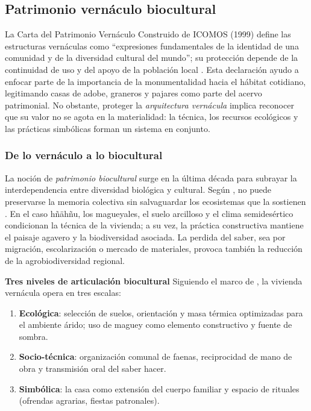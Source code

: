 \subsection{Patrimonio vernáculo biocultural}
\label{subsec:vernaculo_biocultural}

La Carta del Patrimonio Vernáculo Construido de ICOMOS (1999) define las
estructuras vernáculas como ``expresiones fundamentales de la identidad
de una comunidad y de la diversidad cultural del mundo''; su protección
depende de la continuidad de uso y del apoyo de la población local
\citep{icomos1999carta}.  Esta declaración ayudo a enfocar parte de la importancia de la
monumentalidad hacia el hábitat cotidiano, legitimando casas de adobe,
graneros y pajares como parte del acervo patrimonial.  No obstante,
proteger la \emph{arquitectura vernácula} implica reconocer que su valor
no se agota en la materialidad: la técnica, los recursos ecológicos y
las prácticas simbólicas forman un sistema en conjunto.

\subsubsection{De lo vernáculo a lo biocultural}

La noción de \emph{patrimonio biocultural} surge en la última década
para subrayar la interdependencia entre diversidad biológica y cultural.
Según \citeauthor{chang2010patrimonio}, no puede preservarse la memoria
colectiva sin salvaguardar los ecosistemas que la sostienen
\citep{chang2010patrimonio}.  En el caso hñähñu, los
magueyales, el suelo arcilloso y el clima semidesértico condicionan la
técnica de la vivienda; a su vez, la práctica constructiva mantiene el
paisaje agavero y la biodiversidad asociada.  La perdida del saber,
sea por migración, escolarización o mercado de materiales, provoca
también la reducción de la agrobiodiversidad regional.

\medskip
\noindent\textbf{Tres niveles de articulación biocultural}
Siguiendo el marco de \cite{gudynas2010desarrollo}, la vivienda
vernácula opera en tres escalas:

\begin{enumerate}
	\item \textbf{Ecológica}: selección de suelos, orientación y masa
	      térmica optimizadas para el ambiente árido; uso de maguey como
	      elemento constructivo y fuente de sombra.

	\item \textbf{Socio-técnica}: organización comunal de faenas,
	      reciprocidad de mano de obra y transmisión oral del saber hacer.

	\item \textbf{Simbólica}: la casa como extensión del cuerpo familiar
	      y espacio de rituales (ofrendas agrarias, fiestas patronales).
\end{enumerate}

